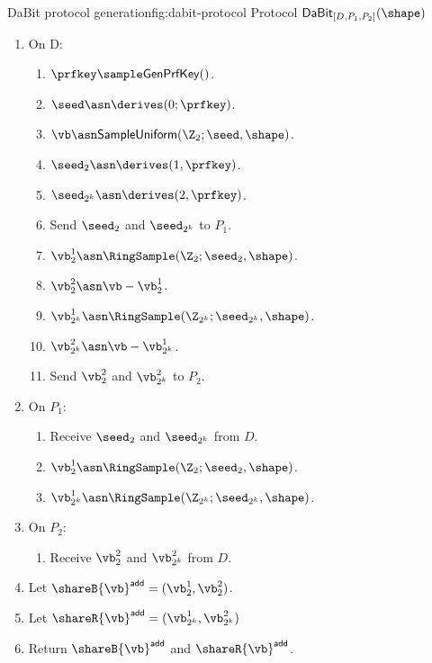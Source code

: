 \begin{Boxfig}{DaBit protocol generation}{fig:dabit-protocol}
  {Protocol $\mathsf{DaBit}_{[D, P_1, P_2]}(\shape)$}
  \begin{enumerate}
  \item On D:
  \begin{enumerate}
    \item $\prfkey \sample \mathsf{GenPrfKey}()$.
    \item $\seed \asn \derives(0; \prfkey)$.
    \item $\vb \asn \mathsf{SampleUniform}(\Z_2; \seed, \shape)$.
    \item $\seed_2 \asn \derives(1, \prfkey)$.
    \item $\seed_{2^k} \asn \derives(2, \prfkey)$.
    \item Send $\seed_2$ and $\seed_{2^k}$ to $P_1$.
    
    \item $\vb^1_{2} \asn \RingSample(\Z_2; \seed_2, \shape)$.
    \item $\vb^2_{2} \asn \vb - \vb^1_{2}$.
    \item $\vb^1_{2^k} \asn \RingSample(\Z_{2^k}; \seed_{2^k}, \shape)$.
    \item $\vb^2_{2^k} \asn \vb - \vb^1_{2^k}$.
    \item Send $\vb^2_2$ and $\vb^2_{2^k}$ to $P_2$.
  \end{enumerate}

  \item On $P_1$:
 \begin{enumerate}
     \item Receive $\seed_2$ and $\seed_{2^k}$ from $D$.
     \item $\vb^1_{2} \asn \RingSample(\Z_2; \seed_2, \shape)$.
     \item $\vb^1_{2^k} \asn \RingSample(\Z_{2^k}; \seed_{2^k}, \shape)$.
 \end{enumerate}
\item On $P_2$:
\begin{enumerate}
    \item Receive $\vb^2_2$ and $\vb^2_{2^k}$ from $D$.
\end{enumerate}
\item Let $\shareB{\vb}^\mathsf{add} = (\vb^1_2, \vb^2_2)$.
\item Let $\shareR{\vb}^\mathsf{add} = (\vb^1_{2^k}, \vb^2_{2^k})$
\item Return $\shareB{\vb}^\mathsf{add}$ and $\shareR{\vb}^\mathsf{add}$.
\end{enumerate}
\end{Boxfig}

